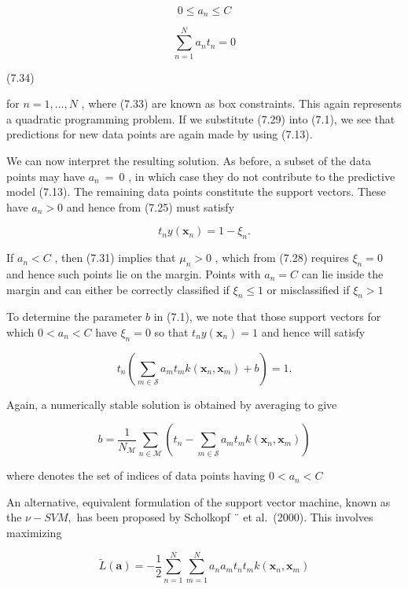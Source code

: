 \documentclass[
  10
]{article}
\begin{document}
\[
0 \leqslant a _ {n} \leqslant C
\]

\[
\sum_ {n = 1} ^ {N} a _ {n} t _ {n} = 0\tag{7.33}
\]

(7.34)

for \(n = 1 , \ldots , N\) , where (7.33) are known as box constraints.
This again represents a quadratic programming problem. If we substitute
(7.29) into (7.1), we see that predictions for new data points are again
made by using (7.13).

We can now interpret the resulting solution. As before, a subset of the
data points may have \(a _ { n } ~ = ~ 0\) , in which case they do not
contribute to the predictive model (7.13). The remaining data points
constitute the support vectors. These have \(a _ { n } > 0\) and hence
from (7.25) must satisfy

\[
t _ {n} y (\mathbf {x} _ {n}) = 1 - \xi_ {n}.\tag{7.35}
\]

If \(a _ { n } < C\) , then (7.31) implies that \(\mu _ { n } > 0\) ,
which from (7.28) requires \(\xi _ { n } = 0\) and hence such points lie
on the margin. Points with \(a _ { n } = C\) can lie inside the margin
and can either be correctly classified if \(\xi _ { n } \leqslant 1\) or
misclassified if \(\xi _ { n } > 1\)

To determine the parameter \(b\) in (7.1), we note that those support
vectors for which \(0 < a _ { n } < C\) have \(\xi _ { n } = 0\) so that
\(t _ { n } y ( \mathbf x _ { n } ) = 1\) and hence will satisfy

\[
t _ {n} \left(\sum_ {m \in \mathcal {S}} a _ {m} t _ {m} k (\mathbf {x} _ {n}, \mathbf {x} _ {m}) + b\right) = 1.\tag{7.36}
\]

Again, a numerically stable solution is obtained by averaging to give

\[
b = \frac {1}{N _ {\mathcal {M}}} \sum_ {n \in \mathcal {M}} \left(t _ {n} - \sum_ {m \in \mathcal {S}} a _ {m} t _ {m} k (\mathbf {x} _ {n}, \mathbf {x} _ {m})\right)\tag{7.37}
\]

where denotes the set of indices of data points having
\(0 < a _ { n } < C\)

An alternative, equivalent formulation of the support vector machine,
known as the \(\nu { - } S V M ,\) has been proposed by Scholkopf ¨ et
al.~(2000). This involves maximizing

\[
\widetilde {L} (\mathbf {a}) = - \frac {1}{2} \sum_ {n = 1} ^ {N} \sum_ {m = 1} ^ {N} a _ {n} a _ {m} t _ {n} t _ {m} k (\mathbf {x} _ {n}, \mathbf {x} _ {m})\tag{7.38}
\]
\end{document}
